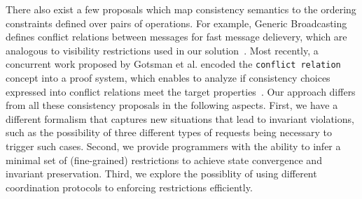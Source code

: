 There also exist a few proposals which map consistency semantics to 
the ordering constraints defined over pairs of operations. For example, Generic Broadcasting 
defines conflict relations between messages for fast message delievery,
which are analogous to visibility restrictions used in our solution~\cite{Pedone99genericbroadcast}. 
Most recently, a concurrent work proposed by Gotsman et al. 
encoded the {\tt conflict relation} concept into 
a proof system, which enables to analyze if consistency 
choices expressed into conflict relations
meet the target properties~\cite{GotsmanConsistencyReason}. Our approach differs from 
all these consistency proposals in the following aspects. First, we have a different formalism that 
captures new situations that lead to invariant violations, such as the 
possibility of three different types of requests being necessary to trigger such cases. Second, 
we provide programmers with the ability to infer a
minimal set of (fine-grained) restrictions to achieve state convergence
and invariant preservation. Third, we explore the possiblity of using different 
coordination protocols to enforcing restrictions efficiently.

